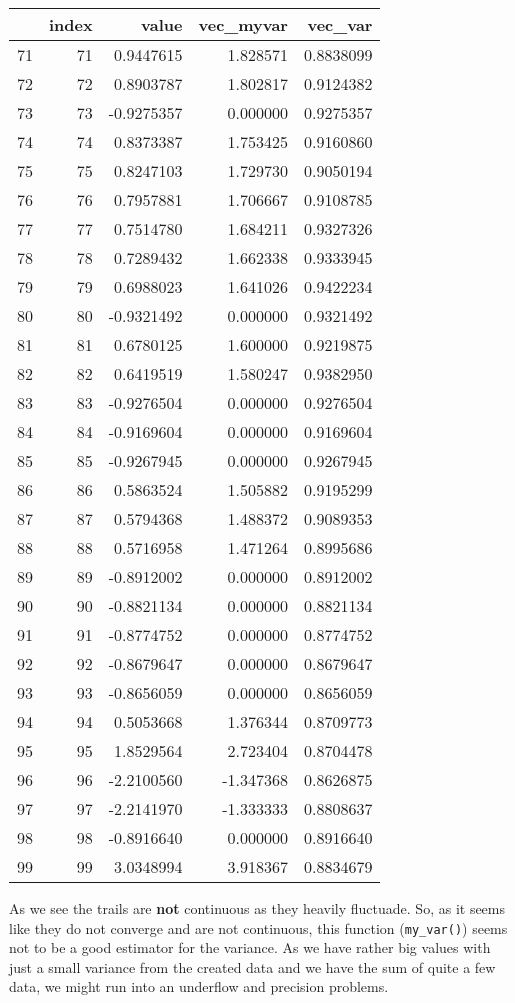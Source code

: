 \documentclass[]{article}
\newenvironment{Shaded}{\begin{snugshade}}{\end{snugshade}}
\newcommand{\KeywordTok}[1]{\textcolor[rgb]{0.13,0.29,0.53}{\textbf{#1}}}
\newcommand{\DecValTok}[1]{\textcolor[rgb]{0.00,0.00,0.81}{#1}}
\newcommand{\StringTok}[1]{\textcolor[rgb]{0.31,0.60,0.02}{#1}}
\newcommand{\OperatorTok}[1]{\textcolor[rgb]{0.81,0.36,0.00}{\textbf{#1}}}
\newcommand{\NormalTok}[1]{#1}
\begin{document}
\begin{Shaded}
\end{Shaded}

\begin{longtable}[]{@{}lrrrr@{}}
\toprule
& index & value & vec\_myvar & vec\_var\tabularnewline
\midrule
\endhead
71 & 71 & 0.9447615 & 1.828571 & 0.8838099\tabularnewline
72 & 72 & 0.8903787 & 1.802817 & 0.9124382\tabularnewline
73 & 73 & -0.9275357 & 0.000000 & 0.9275357\tabularnewline
74 & 74 & 0.8373387 & 1.753425 & 0.9160860\tabularnewline
75 & 75 & 0.8247103 & 1.729730 & 0.9050194\tabularnewline
76 & 76 & 0.7957881 & 1.706667 & 0.9108785\tabularnewline
77 & 77 & 0.7514780 & 1.684211 & 0.9327326\tabularnewline
78 & 78 & 0.7289432 & 1.662338 & 0.9333945\tabularnewline
79 & 79 & 0.6988023 & 1.641026 & 0.9422234\tabularnewline
80 & 80 & -0.9321492 & 0.000000 & 0.9321492\tabularnewline
81 & 81 & 0.6780125 & 1.600000 & 0.9219875\tabularnewline
82 & 82 & 0.6419519 & 1.580247 & 0.9382950\tabularnewline
83 & 83 & -0.9276504 & 0.000000 & 0.9276504\tabularnewline
84 & 84 & -0.9169604 & 0.000000 & 0.9169604\tabularnewline
85 & 85 & -0.9267945 & 0.000000 & 0.9267945\tabularnewline
86 & 86 & 0.5863524 & 1.505882 & 0.9195299\tabularnewline
87 & 87 & 0.5794368 & 1.488372 & 0.9089353\tabularnewline
88 & 88 & 0.5716958 & 1.471264 & 0.8995686\tabularnewline
89 & 89 & -0.8912002 & 0.000000 & 0.8912002\tabularnewline
90 & 90 & -0.8821134 & 0.000000 & 0.8821134\tabularnewline
91 & 91 & -0.8774752 & 0.000000 & 0.8774752\tabularnewline
92 & 92 & -0.8679647 & 0.000000 & 0.8679647\tabularnewline
93 & 93 & -0.8656059 & 0.000000 & 0.8656059\tabularnewline
94 & 94 & 0.5053668 & 1.376344 & 0.8709773\tabularnewline
95 & 95 & 1.8529564 & 2.723404 & 0.8704478\tabularnewline
96 & 96 & -2.2100560 & -1.347368 & 0.8626875\tabularnewline
97 & 97 & -2.2141970 & -1.333333 & 0.8808637\tabularnewline
98 & 98 & -0.8916640 & 0.000000 & 0.8916640\tabularnewline
99 & 99 & 3.0348994 & 3.918367 & 0.8834679\tabularnewline
\bottomrule
\end{longtable}

As we see the trails are \textbf{not} continuous as they heavily
fluctuade. So, as it seems like they do not converge and are not
continuous, this function (\texttt{my\_var()}) seems not to be a good
estimator for the variance. As we have rather big values with just a
small variance from the created data and we have the sum of quite a few
data, we might run into an underflow and precision problems.
\end{document}
